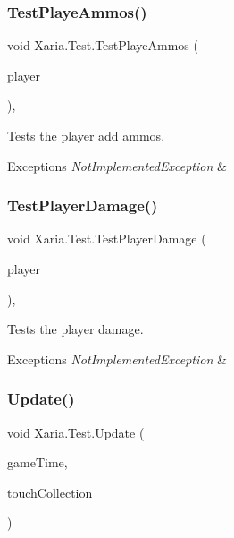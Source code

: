 \subsubsection{\texorpdfstring{Test\+Playe\+Ammos()}{TestPlayeAmmos()}}
{\footnotesize\ttfamily void Xaria.\+Test.\+Test\+Playe\+Ammos (\begin{DoxyParamCaption}\item[{ref \hyperlink{classXaria_1_1Player}{Player}}]{player }\end{DoxyParamCaption})\hspace{0.3cm}{\ttfamily [inline]}, {\ttfamily [private]}}



Tests the player add ammos. 


\begin{DoxyExceptions}{Exceptions}
{\em Not\+Implemented\+Exception} & \\
\hline
\end{DoxyExceptions}
\mbox{\label{classXaria_1_1Test_a459546edfae1ef2d205103128e46593c}} 
\subsubsection{\texorpdfstring{Test\+Player\+Damage()}{TestPlayerDamage()}}
{\footnotesize\ttfamily void Xaria.\+Test.\+Test\+Player\+Damage (\begin{DoxyParamCaption}\item[{ref \hyperlink{classXaria_1_1Player}{Player}}]{player }\end{DoxyParamCaption})\hspace{0.3cm}{\ttfamily [inline]}, {\ttfamily [private]}}



Tests the player damage. 


\begin{DoxyExceptions}{Exceptions}
{\em Not\+Implemented\+Exception} & \\
\hline
\end{DoxyExceptions}
\mbox{\label{classXaria_1_1Test_af6298f90365209347b5bd4581ff7761d}} 
\subsubsection{\texorpdfstring{Update()}{Update()}}
{\footnotesize\ttfamily void Xaria.\+Test.\+Update (\begin{DoxyParamCaption}\item[{Game\+Time}]{game\+Time,  }\item[{Touch\+Collection}]{touch\+Collection }\end{DoxyParamCaption})\hspace{0.3cm}{\ttfamily [inline]}}



